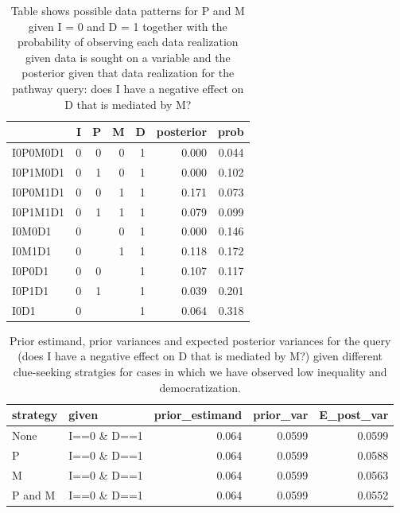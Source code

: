 \documentclass[
  12pt,
]{book}
\begin{document}
\begin{table}

\caption{\label{tab:possibleoutcomespimdpath}\label{possible_outcomespimd_path} Table shows possible data patterns for P and M given I = 0 and D = 1 together with the probability of observing each data realization given data is sought on a variable and the posterior given that data realization for the pathway query: does I have a negative effect on D that is mediated by M?}
\centering
\begin{tabular}[t]{l|r|r|r|r|r|r}
\hline
  & I & P & M & D & posterior & prob\\
\hline
I0P0M0D1 & 0 & 0 & 0 & 1 & 0.000 & 0.044\\
\hline
I0P1M0D1 & 0 & 1 & 0 & 1 & 0.000 & 0.102\\
\hline
I0P0M1D1 & 0 & 0 & 1 & 1 & 0.171 & 0.073\\
\hline
I0P1M1D1 & 0 & 1 & 1 & 1 & 0.079 & 0.099\\
\hline
I0M0D1 & 0 &  & 0 & 1 & 0.000 & 0.146\\
\hline
I0M1D1 & 0 &  & 1 & 1 & 0.118 & 0.172\\
\hline
I0P0D1 & 0 & 0 &  & 1 & 0.107 & 0.117\\
\hline
I0P1D1 & 0 & 1 &  & 1 & 0.039 & 0.201\\
\hline
I0D1 & 0 &  &  & 1 & 0.064 & 0.318\\
\hline
\end{tabular}
\end{table}

\begin{table}

\caption{\label{tab:pimdlearnpath}\label{pimdlearn_path}Prior estimand, prior variances and expected posterior variances for the query (does I have a negative effect on D that is mediated by M?) given different  clue-seeking  stratgies for cases in which we have observed low inequality and democratization.}
\centering
\begin{tabular}[t]{l|l|r|r|r}
\hline
strategy & given & prior\_estimand & prior\_var & E\_post\_var\\
\hline
None & I==0 \& D==1 & 0.064 & 0.0599 & 0.0599\\
\hline
P & I==0 \& D==1 & 0.064 & 0.0599 & 0.0588\\
\hline
M & I==0 \& D==1 & 0.064 & 0.0599 & 0.0563\\
\hline
P and M & I==0 \& D==1 & 0.064 & 0.0599 & 0.0552\\
\hline
\end{tabular}
\end{table}
\end{document}
